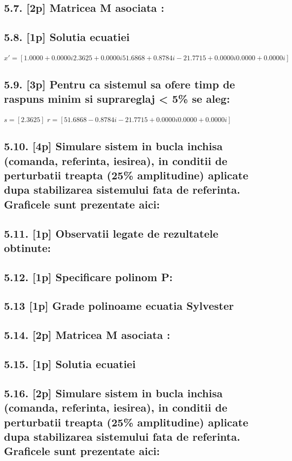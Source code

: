 \documentclass[12pt,english]{article}
\begin{document}
\subsection {5.7. [2p]  Matricea M asociata : }
\subsection {5.8. [1p] Solutia ecuatiei}
$x' = [1.0000 + 0.0000i   2.3625 + 0.0000i  51.6868 + 0.8784i -21.7715 + 0.0000i   0.0000 + 0.0000i]$
\subsection {5.9. [3p] Pentru ca sistemul sa ofere timp de raspuns minim si suprareglaj < 5\% se aleg: }
$s = [2.3625]$
$r = [51.6868 - 0.8784i -21.7715 + 0.0000i   0.0000 + 0.0000i]$
\subsection {5.10. [4p]  Simulare sistem in bucla inchisa (comanda, referinta, iesirea), in conditii de perturbatii treapta (25\% amplitudine) aplicate dupa stabilizarea sistemului fata de referinta. Graficele sunt prezentate aici: }
\subsection {5.11. [1p] Observatii legate de rezultatele obtinute: }

\subsection {5.12. [1p] Specificare polinom P: }
\subsection {5.13 [1p] Grade polinoame ecuatia Sylvester }
\subsection {5.14. [2p]  Matricea M asociata : }
\subsection {5.15. [1p] Solutia ecuatiei}
\subsection {5.16. [2p]  Simulare sistem in bucla inchisa (comanda, referinta, iesirea), in conditii de perturbatii treapta (25\% amplitudine) aplicate dupa stabilizarea sistemului fata de referinta. Graficele sunt prezentate aici: }
\end{document}
